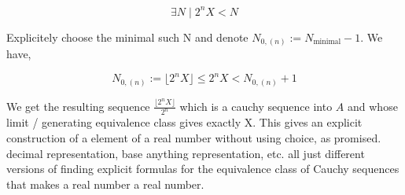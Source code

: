\[ \exists N \mid 2^nX < N \]

Explicitely choose the minimal such N and denote $N_{0,(n)} := N_{\text{minimal}} - 1$. We have, 

\[ N_{0,(n)} := \lfloor 2^n X\rfloor \leq 2^nX < N_{0,(n)} + 1 \]

We get the resulting sequence $\frac{\lfloor 2^n X\rfloor}{2^n}$ which is a cauchy sequence into $A$ and whose limit / generating equivalence class gives exactly X. This gives an explicit construction of a element of a real number without using choice, as promised. \\


decimal representation, base anything representation, etc. all just different versions of finding explicit formulas for the equivalence class of Cauchy sequences that makes a real number a real number. \\